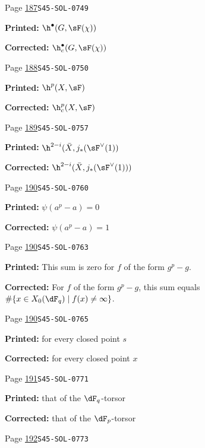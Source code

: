 \begin{description}
\smallskip
\item[\hypertarget{apparatus:EN-0113}{113}] Page \hyperlink{printpage:en:187}{187}\quad\texttt{S45-SOL-0749}
\par\noindent\textbf{Printed:} \(\h^\bullet(G,\sF(\chi))\)
\par\noindent\textbf{Corrected:} \(\h_c^\bullet(G,\sF(\chi))\)
\smallskip
\item[\hypertarget{apparatus:EN-0114}{114}] Page \hyperlink{printpage:en:188}{188}\quad\texttt{S45-SOL-0750}
\par\noindent\textbf{Printed:} \(\h^p(X,\sF)\)
\par\noindent\textbf{Corrected:} \(\h_c^p(X,\sF)\)
\smallskip
\item[\hypertarget{apparatus:EN-0115}{115}] Page \hyperlink{printpage:en:189}{189}\quad\texttt{S45-SOL-0757}
\par\noindent\textbf{Printed:} \(\h^{2-i}(\bar X,j_\ast(\sF^\vee(1))\)
\par\noindent\textbf{Corrected:} \(\h^{2-i}(\bar X,j_\ast(\sF^\vee(1)))\)
\smallskip
\item[\hypertarget{apparatus:EN-0116}{116}] Page \hyperlink{printpage:en:190}{190}\quad\texttt{S45-SOL-0760}
\par\noindent\textbf{Printed:} \(\psi(a^p-a)=0\)
\par\noindent\textbf{Corrected:} \(\psi(a^p-a)=1\)
\smallskip
\item[\hypertarget{apparatus:EN-0117}{117}] Page \hyperlink{printpage:en:190}{190}\quad\texttt{S45-SOL-0763}
\par\noindent\textbf{Printed:} This sum is zero for $f$ of the form $g^p-g$.
\par\noindent\textbf{Corrected:} For $f$ of the form $g^p-g$, this sum equals $\#\{x\in X_0(\dF_q)\mid f(x)\ne\infty\}$.
\smallskip
\item[\hypertarget{apparatus:EN-0118}{118}] Page \hyperlink{printpage:en:190}{190}\quad\texttt{S45-SOL-0765}
\par\noindent\textbf{Printed:} for every closed point $s$
\par\noindent\textbf{Corrected:} for every closed point $x$
\smallskip
\item[\hypertarget{apparatus:EN-0119}{119}] Page \hyperlink{printpage:en:191}{191}\quad\texttt{S45-SOL-0771}
\par\noindent\textbf{Printed:} that of the $\dF_q$-torsor
\par\noindent\textbf{Corrected:} that of the $\dF_p$-torsor
\smallskip
\item[\hypertarget{apparatus:EN-0120}{120}] Page \hyperlink{printpage:en:192}{192}\quad\texttt{S45-SOL-0773}

\end{description}
